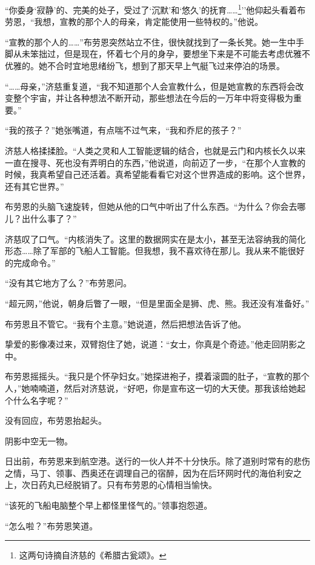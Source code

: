 \documentclass[AutoFakeBold=true]{book}
\begin{document}
``你委身`寂静'的、完美的处子，受过了`沉默'和`悠久'的抚育……\footnote{这两句诗摘自济慈的《希腊古瓮颂》。}''他仰起头看着布劳恩，``我想，宣教的那个人的母亲，肯定能使用一些特权的。''他说。

``宣教的那个人的……''布劳恩突然站立不住，很快就找到了一条长凳。她一生中手脚从未笨拙过，但是现在，怀着七个月的身孕，要想坐下来是不可能去考虑优雅不优雅的。她不合时宜地思绪纷飞，想到了那天早上气艇飞过来停泊的场景。

``……母亲，''济慈重复道，``我不知道那个人会宣教什么，但是她宣教的东西将会改变整个宇宙，并让各种想法不断开动，那些想法在今后的一万年中将变得极为重要。''

``我的孩子？''她张嘴道，有点喘不过气来，``我和乔尼的孩子？''

济慈人格揉揉脸。``人类之灵和人工智能逻辑的结合，也就是云门和内核长久以来一直在搜寻、死也没有弄明白的东西，''他说道，向前迈了一步，``在那个人宣教的时候，我真希望自己还活着。真希望能看看它对这个世界造成的影响。这个世界，还有其它世界。''

布劳恩的头脑飞速旋转，但她从他的口气中听出了什么东西。``为什么？你会去哪儿？出什么事了？''

济慈叹了口气。``内核消失了。这里的数据网实在是太小，甚至无法容纳我的简化形态……除了军部的飞船人工智能。但我想，我不喜欢待在那儿。我从来不能很好的完成命令。''

``没有其它地方了么？''布劳恩问。

``超元网，''他说，朝身后瞥了一眼，``但是里面全是狮、虎、熊。我还没有准备好。''

布劳恩且不管它。``我有个主意。''她说道，然后把想法告诉了他。

挚爱的影像凑过来，双臂抱住了她，说道：``女士，你真是个奇迹。''他走回阴影之中。

布劳恩摇摇头。``我只是个怀孕妇女。''她探进袍子，摸着滚圆的肚子，``宣教的那个人，''她喃喃道，然后对济慈说，``好吧，你是宣布这一切的大天使。那我该给她起个什么名字呢？''

没有回应，布劳恩抬起头。

阴影中空无一物。

\vspace*{1em}

日出前，布劳恩来到航空港。送行的一伙人并不十分快乐。除了道别时常有的悲伤之情，马丁、领事、西奥还在调理自己的宿醉，因为在后环网时代的海伯利安之上，次日药丸已经脱销了。只有布劳恩的心情相当愉快。

``该死的飞船电脑整个早上都怪里怪气的。''领事抱怨道。

``怎么啦？''布劳恩笑道。
\end{document}
